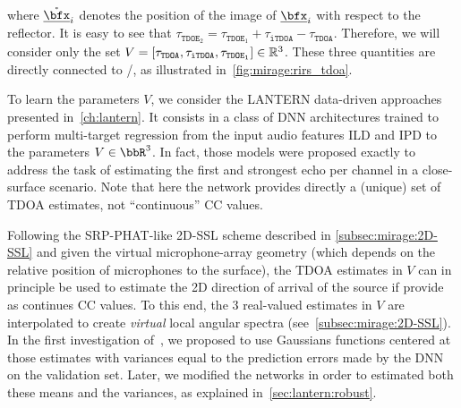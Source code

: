 where $\mathring{\positionMicrophone}_i$ denotes the position of the image of $\positionMicrophone_i$ with respect to the reflector.
It is easy to see that $\tau_{\mathtt{TDOE}_2} =  \tau_{\mathtt{TDOE}_1} + \tau_\mathtt{iTDOA} - \tau_\mathtt{TDOA}$.
Therefore, we will consider only the set $V = \klist{\tau_{\mathtt{TDOA}}, \tau_{\mathtt{iTDOA}}, \tau_{\mathtt{TDOE}_1}}\in\mathbb{R}^3$.
These three quantities are directly connected to \RIRs/, as illustrated in~\cref{fig:mirage:rirs_tdoa}.%

\mynewline
To learn the parameters $V$, we consider the \acs{LANTERN} data-driven approaches presented in~\cref{ch:lantern}.
It consists in a class of \ac{DNN} architectures trained to perform multi-target regression from the input audio features \acf{ILD} and \acf{IPD} to the parameters $V\in\bbR^3$.
In fact, those models were proposed exactly to address the task of estimating the first and strongest echo per channel in a close-surface scenario.
Note that here the network provides directly a (unique) set of \ac{TDOA} estimates, not ``continuous'' \ac{CC} values.

\mynewline
Following the \ac{SRP-PHAT}-like 2D-\ac{SSL} scheme described in \cref{subsec:mirage:2D-SSL} and given the virtual microphone-array geometry (which depends on the relative position of microphones to the surface), the \ac{TDOA} estimates in $V$ can in principle be used to estimate the 2D direction of arrival of the source if provide as continues \ac{CC} values.
To this end, the 3 real-valued estimates in $V$ are interpolated to create \textit{virtual} local angular spectra (see~\cref{subsec:mirage:2D-SSL}).
In the first investigation of~, we proposed to use Gaussians functions centered at those estimates with variances equal to the prediction errors made by the \ac{DNN} on the validation set.
Later, we modified the networks in order to estimated both these means and the variances, as explained in~\cref{sec:lantern:robust}.

